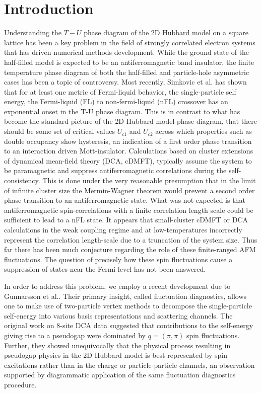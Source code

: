 \documentclass[twocolumn,notitlepage,prb,superscriptaddress,showpacs]{revtex4-1}
\begin{document}
\section{Introduction \label{sec:introduction}}
Understanding the $T-U$ phase diagram of the 2D Hubbard model on a square lattice has been a key problem  in the field of strongly correlated electron systems that has driven numerical methods development.
While the ground state of the half-filled model is expected to be an antiferromagnetic band insulator, the finite temperature phase diagram of both the half-filled and particle-hole asymmetric cases has been a topic of controversy.\cite{schafer:2015}
Most recently, Simkovic et al. \cite{simkovic:2019, simkovic2017determinant} has shown that for at least one metric of Fermi-liquid behavior, the single-particle self energy\cite{park:2008},  the Fermi-liquid (FL) to non-fermi-liquid (nFL) crossover has an exponential onset in the T-U phase diagram. 
This is in contrast to what has become the standard picture of the 2D Hubbard model phase diagram,\cite{park:2008} that there should be some set of critical values $U_{c1}$ and $U_{c2}$ across which properties such as double occupancy show hysteresis, an indication of a first order phase transition to an interaction driven Mott-insulator. 
Calculations based on cluster extensions of dynamical mean-field theory (DCA, cDMFT), typically assume the system to be paramagnetic and suppress antiferromagnetic correlations during the self-consistency.  This is done under the very reasonable presumption that in the limit of infinite cluster size the Mermin-Wagner theorem would prevent a  second order phase transition to an antiferromagnetic state.  
What was not expected is that antiferromagnetic spin-correlations with a finite correlation length scale could be sufficient to lead to a nFL state.  
It appears that small-cluster cDMFT or DCA calculations in the weak coupling regime and at low-temperatures incorrectly represent the correlation length-scale due to a truncation of the system size.\cite{georges:1996, leblanc:2013}
Thus far there has been much conjecture regarding the role of these finite-ranged AFM fluctuations.\cite{schafer:2015}
The question of precisely how these spin fluctuations cause a suppression of states near the Fermi level has not been answered.

In order to address this problem, we employ a recent development due to  Gunnarsson et al.\cite{gunnarsson:2015}. Their primary insight, called fluctuation diagnostics, allows one to make use of two-particle vertex methods to decompose the single-particle self-energy into various basis representations and scattering channels.   The original work on 8-site DCA data suggested that contributions to the self-energy giving rise to a pseudogap were dominated by $q=(\pi,\pi)$ spin fluctuations. Further, they showed unequivocally that the physical process resulting in pseudogap physics in the 2D Hubbard model is best represented by spin excitations rather than in the charge or particle-particle channels, an observation supported by diagrammatic application of the same fluctuation diagnostics procedure.\cite{wu:2017} 
\end{document}
